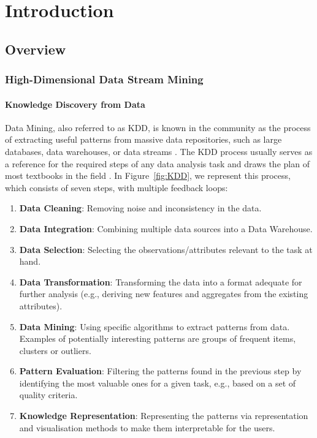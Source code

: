 \hypersetup{pageanchor=false}
\part{Introduction}
\hypersetup{pageanchor=true}

\chapter{Overview}
\label{chapter:overview}
\glsresetall

\section{High-Dimensional Data Stream Mining}

\subsection{Knowledge Discovery from Data}

Data Mining, also referred to as \gls{KDD}, is known in the community as the process of extracting useful patterns from massive data repositories, such as large databases, data warehouses, or data streams \cite{DBLP:books/mk/HanKP2011}. The \gls{KDD} process usually serves as a reference for the required steps of any data analysis task and draws the plan of most textbooks in the field \cite{DBLP:books/sp/DM2005, DBLP:books/mk/HanKP2011,kantardzic2011data,DBLP:books/sp/Aggarwal15}. In Figure~\ref{fig:KDD}, we represent this process, which consists of seven steps, with multiple feedback loops: 
\begin{enumerate}[noitemsep]
	\item \textbf{Data Cleaning}: Removing noise and inconsistency in the data.
	\item \textbf{Data Integration}: Combining multiple data sources into a Data Warehouse.
	\item \textbf{Data Selection}: Selecting the observations/attributes relevant to the task at hand.
	\item \textbf{Data Transformation}: Transforming the data into a format adequate for further analysis (e.g., deriving new features and aggregates from the existing attributes).
	\item \textbf{Data Mining}: Using specific algorithms to extract patterns from data. Examples of potentially interesting patterns are groups of frequent items, clusters or outliers. 
	\item \textbf{Pattern Evaluation}: Filtering the patterns found in the previous step by identifying the most valuable ones for a given task, e.g., based on a set of quality criteria.
	\item \textbf{Knowledge Representation}: Representing the patterns via representation and visualisation methods to make them interpretable for the users. 
\end{enumerate} 

